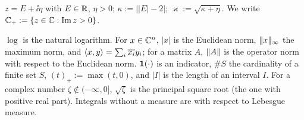 \begin{convention}\label{conv:z}
$z=E+\ii\eta$ with $E\in\mathbb{R}$, $\eta>0$; $\kappa:=\big||E|-2\big|$; $\varkappa:=\sqrt{\kappa+\eta}$. We write $\mathbb{C}_+:=\{z\in\mathbb{C}:\operatorname{Im} z>0\}$.
\end{convention}
\begin{convention}\label{conv:not}
$\log$ is the natural logarithm. For $x\in\mathbb{C}^n$, $|x|$ is the Euclidean norm, $\|x\|_\infty$ the maximum norm, and $\langle x,y\rangle=\sum_i\overline{x_i}y_i$;
for a matrix $A$, $\|A\|$ is the operator norm with respect to the Euclidean norm. $\mathbf{1}(\cdot)$ is an indicator, $\#S$ the cardinality of a finite set $S$,
$(t)_+:=\max(t,0)$, and $|I|$ is the length of an interval $I$. For a complex number $\zeta\notin(-\infty,0]$, $\sqrt\zeta$ is the principal square root (the one with positive real part).
Integrals without a measure are with respect to Lebesgue measure.
\end{convention}
